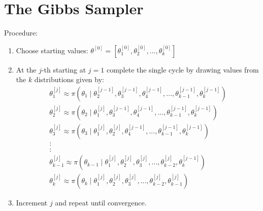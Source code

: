 \documentclass[lecture,12pt,]{pcms-l}
\numberwithin{section}{chapter}
\numberwithin{equation}{chapter}
\theoremstyle{plain}
\theoremstyle{definition}
\theoremstyle{definition}
\begin{document}
\section{The Gibbs Sampler}
Procedure:
\begin{enumerate}
\item Choose starting values: $\theta^{\left [ 0 \right ]}=\left [ \theta^{\left [ 0 \right ]}_1,\theta^{\left [ 0 \right ]}_2,...,\theta^{\left [ 0 \right ]}_k \right ]$
\item At the $j$-th  starting at $j=1$ complete the single cycle by drawing values from the $k$ distributions given by:
\begin{equation*}
\begin{split}
\theta^{\left [ j \right ]}_1 \approx \pi( \theta_1 \mid \theta^{\left [ j-1 \right ]}_2,\theta^{\left [ j-1 \right ]}_3,\theta^{\left [ j-1 \right ]}_4,...,\theta^{\left [ j-1 \right ]}_{k-1},\theta^{\left [ j-1 \right ]}_k  )
\\
\theta^{\left [ j \right ]}_2 \approx \pi( \theta_2 \mid \theta^{\left [ j \right ]}_1,\theta^{\left [ j-1 \right ]}_3,\theta^{\left [ j-1 \right ]}_4,...,\theta^{\left [ j-1 \right ]}_{k-1},\theta^{\left [ j-1 \right ]}_k  )
\\
\theta^{\left [ j \right ]}_3 \approx \pi( \theta_3 \mid \theta^{\left [ j \right ]}_1,\theta^{\left [ j \right ]}_2,\theta^{\left [ j-1 \right ]}_4,...,\theta^{\left [ j-1 \right ]}_{k-1},\theta^{\left [ j-1 \right ]}_k  )
\\
:
\\
:
\\
\theta^{\left [ j \right ]}_{k-1} \approx \pi( \theta_{k-1} \mid \theta^{\left [ j \right ]}_1,\theta^{\left [ j \right ]}_2,\theta^{\left [ j \right ]}_3,...,\theta^{\left [ j \right ]}_{k-2},\theta^{\left [ j-1 \right ]}_k  )
\\
\theta^{\left [ j \right ]}_k \approx \pi( \theta_{k} \mid \theta^{\left [ j \right ]}_1,\theta^{\left [ j \right ]}_2,\theta^{\left [ j \right ]}_3,...,\theta^{\left [ j \right ]}_{k-2},\theta^{\left [ j \right ]}_{k-1}  )
\end{split}
\end{equation*}
\item Increment $j$ and repeat until convergence.
\end{enumerate}
\end{document}

